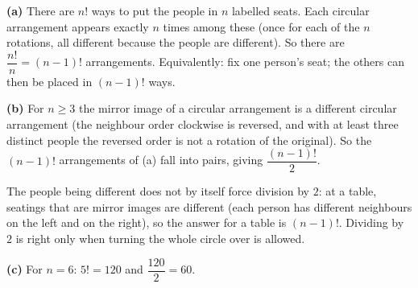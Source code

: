 \textbf{(a)} There are $n!$ ways to put the people in $n$ labelled seats. Each circular arrangement appears exactly $n$ times among these (once for each of the $n$ rotations, all different because the people are different). So there are $\dfrac{n!}{n}=\boxed{(n-1)!}$ arrangements. Equivalently: fix one person's seat; the others can then be placed in $(n-1)!$ ways.

\textbf{(b)} For $n\ge3$ the mirror image of a circular arrangement is a different circular arrangement (the neighbour order clockwise is reversed, and with at least three distinct people the reversed order is not a rotation of the original). So the $(n-1)!$ arrangements of (a) fall into pairs, giving $\boxed{\dfrac{(n-1)!}{2}}$.

The people being different does not by itself force division by $2$: at a table, seatings that are mirror images are different (each person has different neighbours on the left and on the right), so the answer for a table is $(n-1)!$. Dividing by $2$ is right only when turning the whole circle over is allowed.

\textbf{(c)} For $n=6$: $5!=\boxed{120}$ and $\dfrac{120}{2}=\boxed{60}$.
